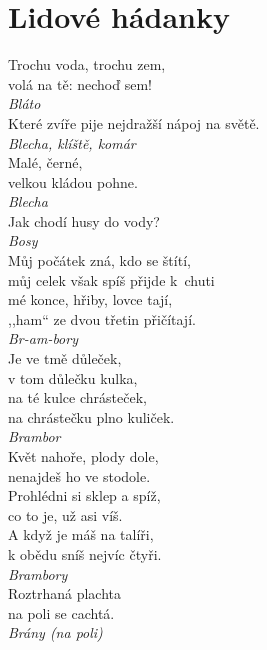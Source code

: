 
\section{Lidové hádanky}
\begin{multicols}{\value{columnsthindata}}

\noindent
Trochu voda, trochu zem,\\
volá na tě: nechoď sem!\\[1 mm]
{\sl Bláto}\\

\noindent
Které zvíře pije nejdražší nápoj na světě.\\[1 mm]
{\sl Blecha, klíště, komár}\\

\noindent
Malé, černé,\\
velkou kládou pohne.\\[1 mm]
{\sl Blecha}\\

\noindent
Jak chodí husy do vody?\\[1 mm]
{\sl Bosy}\\

\noindent
Můj počátek zná, kdo se štítí,\\
můj celek však spíš přijde k~chuti\\
mé konce, hřiby, lovce tají,\\
,,ham`` ze dvou třetin přičítají.\\[1 mm]
{\sl Br-am-bory}\\

\noindent
Je ve tmě důleček,\\
v tom důlečku kulka,\\
na té kulce chrásteček,\\
na chrástečku plno kuliček.\\[1 mm]
{\sl Brambor}\\

\noindent
Květ nahoře, plody dole,\\
nenajdeš ho ve stodole.\\
Prohlédni si sklep a spíž,\\
co to je, už asi víš.\\
A když je máš na talíři,\\
k obědu sníš nejvíc čtyři.\\[1 mm]
{\sl Brambory}\\

\noindent
Roztrhaná plachta\\
na poli se cachtá.\\[1 mm]
{\sl Brány (na poli)}\\


\end{multicols}
